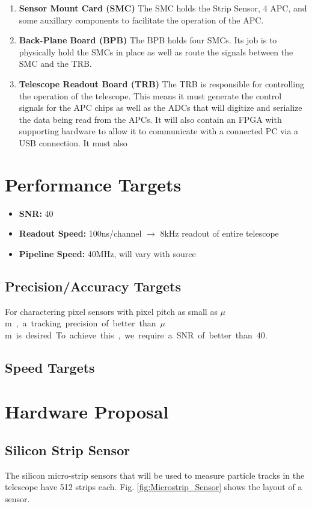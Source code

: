 \documentclass{article}
\newcommand{\itemt}[1]{\item \textbf{#1}}
\newcommand{\um}{$\mu$m}
\begin{document}
\begin{enumerate}
  \itemt{Sensor Mount Card (SMC)}
    The SMC holds the Strip Sensor, 4 \gls{APC}, and some auxillary components to facilitate the operation of the \gls{APC}.
  \itemt{Back-Plane Board (BPB)}
    The BPB holds four SMCs. Its job is to physically hold the SMCs in place as well as route the signals between the SMC and the TRB.
  \itemt{Telescope Readout Board (TRB)}
    The TRB is responsible for controlling the operation of the telescope. This means it must generate the control signals for the \gls{APC} chips as well as the ADCs that will digitize and serialize the data being read from the \gls{APC}s. It will also contain an FPGA with supporting hardware to allow it to communicate with a connected PC via a USB connection. It must also
\end{enumerate}

\section{Performance Targets}

\begin{itemize}
  \itemt{\gls{SNR}:} 40
  \itemt{Readout Speed:} 100ns/channel $\rightarrow$ 8kHz readout of entire telescope
  \itemt{Pipeline Speed:} 40MHz, will vary with source
\end{itemize}


\subsection{Precision/Accuracy Targets}
\label{sec:PerformanceTargets}
For charactering pixel sensors with pixel pitch as small as \unit[25]{\um}, a tracking precision of better than \unit[1]{\um} is desired. To achieve this, we require a \gls{SNR} of better than 40.
\subsection{Speed Targets}

\section{Hardware Proposal}

\subsection{Silicon Strip Sensor}
The silicon micro-strip sensors that will be used to measure particle tracks in the telescope have 512 strips each. Fig. \ref{fig:Microstrip_Sensor} shows the layout of a sensor.
\end{document}
